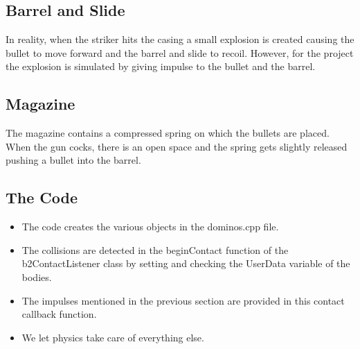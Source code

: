 \documentclass{article}
\begin{document}
\subsection{Barrel and Slide}
In reality, when the striker hits the casing a small explosion is created causing the bullet to move forward and the barrel and slide to recoil. However, for the project the explosion is simulated by giving impulse to the bullet and the barrel.

\subsection{Magazine}
The magazine contains a compressed spring on which the bullets are placed. When the gun cocks, there is an open space and the spring gets slightly released pushing a bullet into the barrel.
\subsection{The Code}
\begin{itemize}
\item The code creates the various objects in the dominos.cpp file.
\item The collisions are detected in the beginContact function of the b2ContactListener class by setting and checking the UserData variable of the bodies\cite{iforce}.
\item The impulses mentioned in the previous section are provided in this contact callback function.
\item We let physics take care of everything else.
\end{itemize}
\end{document}
